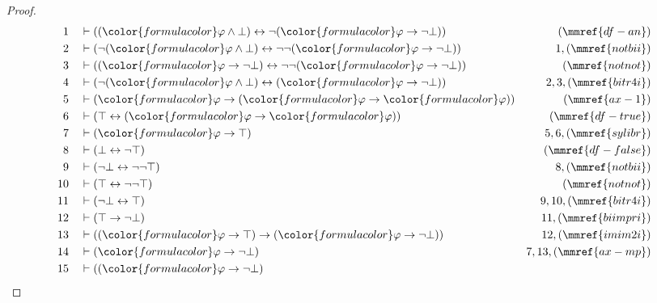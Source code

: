 \documentclass{article}
\theoremstyle{plain}
\begin{document}
\begin{proof}
\begin{align}
  1 && & \vdash ( ( {\color{formulacolor}\varphi} \wedge \bot ) \leftrightarrow
      \lnot ( {\color{formulacolor}\varphi} \rightarrow
      \lnot \bot ) )&(\mmref{df-an})\notag
  \\ 2 && & \vdash ( \lnot ( {\color{formulacolor}\varphi} \wedge \bot )
      \leftrightarrow \lnot \lnot (
      {\color{formulacolor}\varphi} \rightarrow \lnot \bot
      ) )&1,(\mmref{notbii})\notag
  \\ 3 && & \vdash ( ( {\color{formulacolor}\varphi} \rightarrow \lnot \bot )
      \leftrightarrow \lnot \lnot (
      {\color{formulacolor}\varphi} \rightarrow \lnot \bot
      ) )&(\mmref{notnot})\notag
  \\ 4 && & \vdash ( \lnot ( {\color{formulacolor}\varphi} \wedge \bot )
      \leftrightarrow ( {\color{formulacolor}\varphi}
      \rightarrow \lnot \bot )
      )&2,3,(\mmref{bitr4i})\notag
  \\ 5 && & \vdash ( {\color{formulacolor}\varphi} \rightarrow (
      {\color{formulacolor}\varphi} \rightarrow
      {\color{formulacolor}\varphi} )
      )&(\mmref{ax-1})\notag
  \\ 6 && & \vdash ( \top \leftrightarrow ( {\color{formulacolor}\varphi}
      \rightarrow {\color{formulacolor}\varphi} )
      )&(\mmref{df-true})\notag
  \\ 7 && & \vdash ( {\color{formulacolor}\varphi} \rightarrow \top
      )&5,6,(\mmref{sylibr})\notag
  \\ 8 && & \vdash ( \bot \leftrightarrow \lnot \top
      )&(\mmref{df-false})\notag
  \\ 9 && & \vdash ( \lnot \bot \leftrightarrow \lnot \lnot \top
      )&8,(\mmref{notbii})\notag
  \\ 10 && & \vdash ( \top \leftrightarrow \lnot \lnot \top
      )&(\mmref{notnot})\notag
  \\ 11 && & \vdash ( \lnot \bot \leftrightarrow \top
      )&9,10,(\mmref{bitr4i})\notag
  \\ 12 && & \vdash ( \top \rightarrow \lnot \bot )&11,(\mmref{biimpri})\notag
  \\ 13 && & \vdash ( ( {\color{formulacolor}\varphi} \rightarrow \top )
      \rightarrow ( {\color{formulacolor}\varphi}
      \rightarrow \lnot \bot ) )&12,(\mmref{imim2i})\notag
  \\ 14 && & \vdash ( {\color{formulacolor}\varphi} \rightarrow \lnot \bot
      )&7,13,(\mmref{ax-mp})\notag
  \\ 15 && & \vdash ( ( {\color{formulacolor}\varphi} \rightarrow \lnot \bot )

\end{align}
\end{proof}
\end{document}
